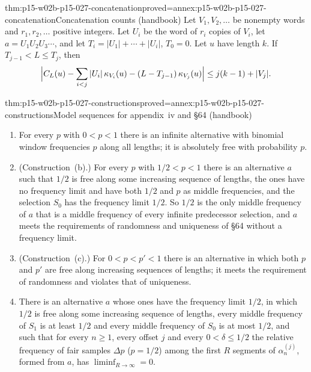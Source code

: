 \begin{hblemma}{thm:p15-w02b-p15-027-concatenation}{proved=annex:p15-w02b-p15-027-concatenation}{Concatenation counts (handbook)}
Let \(V_1,V_2,\ldots\) be nonempty words and \(r_1,r_2,\ldots\) positive
integers. Let \(U_i\) be the word of \(r_i\) copies of \(V_i\), let
\(a=U_1U_2U_3\cdots\), and let
\(T_i=|U_1|+\cdots+|U_i|\), \(T_0=0\). Let \(u\) have length \(k\). If
\(T_{j-1}<L\leq T_j\), then
\[
 \Bigl|C_L(u)-\sum_{i<j}|U_i|\,\kappa_{V_i}(u)-(L-T_{j-1})\,\kappa_{V_j}(u)\Bigr|
 \leq j(k-1)+|V_j| .
\]
\end{hblemma}

\begin{hbtheorem}{thm:p15-w02b-p15-027-constructions}{proved=annex:p15-w02b-p15-027-constructions}{Model sequences for appendix~iv and \S64 (handbook)}
\begin{enumerate}
\item For every \(p\) with \(0<p<1\) there is an infinite alternative
  with binomial window frequencies \(p\) along all lengths; it is
  absolutely free with probability \(p\).
\item (Construction~(b).) For every \(p\) with \(1/2<p<1\) there is an
  alternative \(a\) such that \(1/2\) is free along some increasing
  sequence of lengths, the ones have no frequency limit and have both
  \(1/2\) and \(p\) as middle frequencies, and the selection \(S_0\) has
  the frequency limit \(1/2\). So \(1/2\) is the only middle frequency
  of \(a\) that is a middle frequency of every infinite predecessor
  selection, and \(a\) meets the requirements of randomness and
  uniqueness of \S64 without a frequency limit.
\item (Construction~(c).) For \(0<p<p'<1\) there is an alternative in
  which both \(p\) and \(p'\) are free along increasing sequences of
  lengths; it meets the requirement of randomness and violates that of
  uniqueness.
\item There is an alternative \(a\) whose ones have the frequency limit
  \(1/2\), in which \(1/2\) is free along some increasing sequence of
  lengths, every middle frequency of \(S_1\) is at least \(1/2\) and every
  middle frequency of \(S_0\) is at most \(1/2\), and such that for every
  \(n\geq1\), every offset \(j\) and every \(0<\delta\leq1/2\) the relative
  frequency of fair samples \(\Delta p\) (\(p=1/2\)) among the first \(R\)
  segments of \(\alpha_n^{(j)}\), formed from \(a\), has \(\liminf_{R\to\infty}=0\).
\end{enumerate}
\end{hbtheorem}

